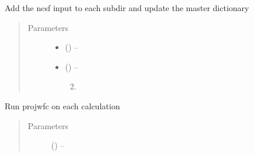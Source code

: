 \documentclass[letterpaper,10pt,english]{sphinxmanual}
\begin{document}
\begin{fulllineitems}
\label{\detokenize{scfuj:scfuj.nscf_nosym_noinv}}
Add the ncsf input to each subdir and update the master dictionary
\begin{quote}\begin{description}
\item[{Parameters}] \leavevmode\begin{itemize}
\item {} 
 (\sphinxstyleliteralemphasis{-}) -- 

\item {} 
\sphinxstyleliteralstrong{ (} (\sphinxstyleliteralemphasis{-}) -- \begin{enumerate}
\setcounter{enumi}{1}
\item {} 
\end{enumerate}


\end{itemize}

\end{description}\end{quote}

\end{fulllineitems}


\begin{fulllineitems}
\label{\detokenize{scfuj:scfuj.projwfc}}
Run projwfc on each calculation
\begin{quote}\begin{description}
\item[{Parameters}] \leavevmode
{} (\sphinxstyleliteralemphasis{-}) -- 

\end{description}\end{quote}

\end{fulllineitems}

\end{document}
